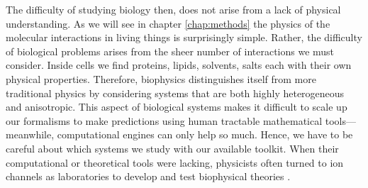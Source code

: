 The difficulty of studying biology then, does not arise from a lack of physical understanding. As we will see in chapter \ref{chap:methods} the physics of the molecular interactions in living things is surprisingly simple. Rather, the difficulty of biological problems arises from the sheer number of interactions we must consider. Inside cells we find proteins, lipids, solvents, salts each with their own physical properties. Therefore, biophysics distinguishes itself from more traditional physics by considering systems that are both highly heterogeneous and anisotropic. This aspect of biological systems makes it difficult to scale up our formalisms to make predictions using human tractable mathematical tools---meanwhile, computational engines can only help so much. Hence, we have to be careful about which systems we study with our available toolkit. When their computational or theoretical tools were lacking, physicists often turned to ion channels as laboratories to develop and test biophysical theories \cite{moy2000, corry2000}.






